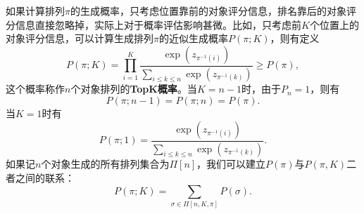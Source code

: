 如果计算排列$\pi$的生成概率，只考虑位置靠前的对象评分信息，排名靠后的对象评分信息直接忽略掉，实际上对于概率评估影响甚微。比如，只考虑前$K$个位置上的对象评分信息，可以计算生成排列$\pi$的近似生成概率$P(\pi;K)$，则有定义
\begin{equation}\label{eq:luce-topk}
    P(\pi; K) = \prod\limits_{i=1}^K \frac{\exp(z_{\pi^{-1}(i)})}{\sum\limits_{i\le k\le n}\exp(z_{\pi^{-1}(k)})} \ge P(\pi),
\end{equation}
这个概率称作$n$个对象排列的\textbf{TopK概率}。当$K=n-1$时，由于$P_n = 1$，则有
\[
    P(\pi;n-1)=P(\pi;n)=P(\pi).
\]
当$K=1$时有
\begin{equation}\label{eq:luce-top1}
    P(\pi; 1) = \frac{\exp(z_{\pi^{-1}(i)})}{\sum\limits_{i\le k\le n}\exp(z_{\pi^{-1}(k)})}.
\end{equation}
如果记$n$个对象生成的所有排列集合为$\Pi[n]$，我们可以建立$P(\pi)$与$P(\pi,K)$二者之间的联系：
\begin{equation}\label{eq:luce-and-topk}
    P(\pi; K) = \sum\limits_{\sigma\in \Pi[n,K,\pi]} P(\sigma).
\end{equation}

